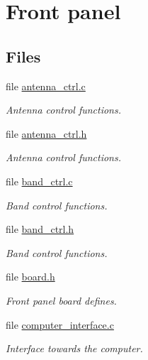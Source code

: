 \hypertarget{group__front__panel__group}{
\section{Front panel}
\label{group__front__panel__group}
}
\subsection*{Files}
\begin{CompactItemize}
\item 
file \hyperlink{antenna__ctrl_8c}{antenna\_\-ctrl.c}
\begin{CompactList}\small\item\em Antenna control functions. \item\end{CompactList}

\item 
file \hyperlink{antenna__ctrl_8h}{antenna\_\-ctrl.h}
\begin{CompactList}\small\item\em Antenna control functions. \item\end{CompactList}

\item 
file \hyperlink{band__ctrl_8c}{band\_\-ctrl.c}
\begin{CompactList}\small\item\em Band control functions. \item\end{CompactList}

\item 
file \hyperlink{band__ctrl_8h}{band\_\-ctrl.h}
\begin{CompactList}\small\item\em Band control functions. \item\end{CompactList}

\item 
file \hyperlink{front__panel_2board_8h}{board.h}
\begin{CompactList}\small\item\em Front panel board defines. \item\end{CompactList}

\item 
file \hyperlink{front__panel_2computer__interface_8c}{computer\_\-interface.c}
\begin{CompactList}\small\item\em Interface towards the computer. \item\end{CompactList}


\end{CompactItemize}
